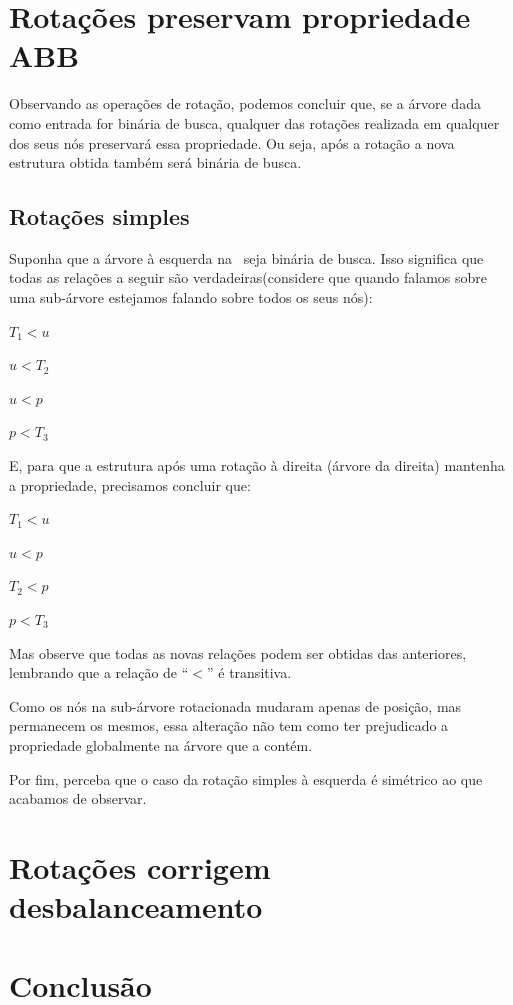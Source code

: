\documentclass[11pt,twoside]{article}
\theoremstyle{definition}
\begin{document}
\section{Rotações preservam propriedade ABB}

Observando as operações de rotação, podemos concluir que, se a árvore dada como entrada for binária de busca, qualquer das rotações realizada em qualquer dos seus nós preservará essa propriedade. Ou seja, após a rotação a nova estrutura obtida também será binária de busca.

\subsection{Rotações simples}
Suponha que a árvore à esquerda na~ seja binária de busca. Isso significa que todas as relações a seguir são verdadeiras(considere que quando falamos sobre uma sub-árvore estejamos falando sobre todos os seus nós):
\begin{itemize}
	\begin{multicols}{2}
		\item \( T_1 < u \)
		\item \( u < T_2 \)
		\item \( u < p \)
		\item \( p < T_3 \)
	\end{multicols}
\end{itemize}

E, para que a estrutura após uma rotação à direita (árvore da direita) mantenha a propriedade, precisamos concluir que:
\begin{itemize}
	\begin{multicols}{2}
		\item \( T_1 < u \)
		\item \( u < p \)
		\item \( T_2 < p \)
		\item \( p < T_3 \)
	\end{multicols}
\end{itemize}

Mas observe que todas as novas relações podem ser obtidas das anteriores, lembrando que a relação de ``\( < \)'' é transitiva.

Como os nós na sub-árvore rotacionada mudaram apenas de posição, mas permanecem os mesmos, essa alteração não tem como ter prejudicado a propriedade globalmente na árvore que a contém.

Por fim, perceba que o caso da rotação simples à esquerda é simétrico ao que acabamos de observar.

\section{Rotações corrigem desbalanceamento}

\section{Conclusão}




\end{document}
